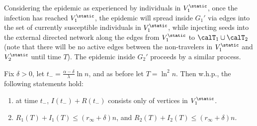\documentclass[11pt]{article}
\begin{document}
Considering the epidemic as experienced by individuals in $V_1^\static$, once the infection has reached $V_1^\static$, the epidemic will spread inside $G_1'$ via edges into the set of currently susceptible individuals in $V_1^\static$, while injecting seeds into the external directed network along the edges from $V_1^\static$ to ${\calT}_1\cup\calT_2$ (note that there will be no active edges between the non-travelers in $V_1^\static$ and $V_2^\static$ until time $T$). The epidemic inside  $G_2'$ proceeds by a similar process.



\begin{proposition}\label{prop:Rinfty-upper-bd}
    Fix $\delta>0$,  let  $t_-= \frac{\alpha-\delta}\lambda\ln n$, and as before let $T=\ln^2n$.  Then w.h.p., the following statements hold: 
    \begin{enumerate}
        \item at time $t_-$, $I(t_-)+R(t_-)$ consists only of vertices in $V_1^\static$.
        \item $R_1(T)+I_1(T)\leq (r_\infty+\delta)n$, and
     $R_2(T)+I_2(T)\leq (r_\infty+\delta)n$.
    \end{enumerate} 
  \end{proposition}
\end{document}
